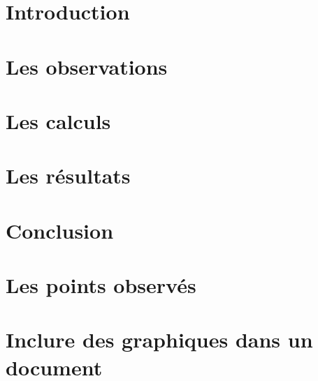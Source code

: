 \documentclass[french]{report}
\begin{document}


%

%

%

%

\tableofcontents


\chapter{Introduction}


\chapter{Les observations}


\chapter{Les calculs}


\chapter{Les résultats}


\chapter{Conclusion}


\appendix
\chapter{Les points observés}

\chapter{Inclure des graphiques dans un document}



\listoffigures
\end{document}
